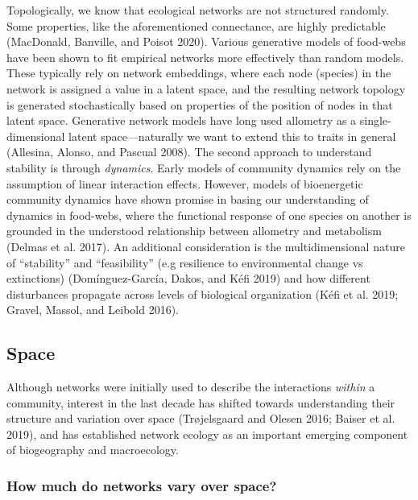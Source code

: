\documentclass[11pt]{article}
\begin{document}
Topologically, we know that ecological networks are not structured
randomly. Some properties, like the aforementioned connectance, are
highly predictable (MacDonald, Banville, and Poisot 2020). Various
generative models of food-webs have been shown to fit empirical networks
more effectively than random models. These typically rely on network
embeddings, where each node (species) in the network is assigned a value
in a latent space, and the resulting network topology is generated
stochastically based on properties of the position of nodes in that
latent space. Generative network models have long used allometry as a
single-dimensional latent space---naturally we want to extend this to
traits in general (Allesina, Alonso, and Pascual 2008). The second
approach to understand stability is through \emph{dynamics}. Early
models of community dynamics rely on the assumption of linear
interaction effects. However, models of bioenergetic community dynamics
have shown promise in basing our understanding of dynamics in food-webs,
where the functional response of one species on another is grounded in
the understood relationship between allometry and metabolism (Delmas et
al. 2017). An additional consideration is the multidimensional nature of
``stability'' and ``feasibility'' (e.g resilience to environmental
change vs extinctions) (Domínguez-García, Dakos, and Kéfi 2019) and how
different disturbances propagate across levels of biological
organization (Kéfi et al. 2019; Gravel, Massol, and Leibold 2016).

\hypertarget{space}{%
\subsection{Space}\label{space}}

Although networks were initially used to describe the interactions
\emph{within} a community, interest in the last decade has shifted
towards understanding their structure and variation over space
(Trøjelsgaard and Olesen 2016; Baiser et al. 2019), and has established
network ecology as an important emerging component of biogeography and
macroecology.

\hypertarget{how-much-do-networks-vary-over-space}{%
\subsubsection{How much do networks vary over
space?}\label{how-much-do-networks-vary-over-space}}
\end{document}
